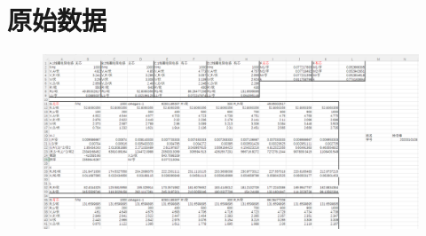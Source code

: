 \documentclass[UTF8]{ctexart}
\begin{document}
\newpage
\section{原始数据}
\begin{figure}[H]\begin{center}
    \includegraphics[scale=0.5]{data.PNG}
\end{center}\end{figure}
\end{document}
